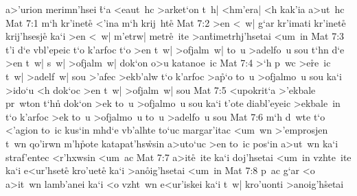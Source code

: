 a>'urion
merimn'hsei
\r{t}`a
<eaut~hc
>arket`on
t~h|
<hm'era|
<h
kak'ia
a>ut~hc\bibvsend
\vs Mat 7:1
m`h
kr'inet\r{e}
<'ina
m`h
krij~ht\r{e}\bibvsend
{}
\vs Mat 7:2
>en
<~w|
g`ar
kr'imati
kr'inet\r{e}
krij'hsesj\r{e}
ka`i
>en
<~w|
m'etrw|
metr\r{e}~ite
>an\r{t}imetrhj'hsetai
<um~in\bibvsend
\vs Mat 7:3
t'i
d`e
vbl'epeic
t`o
k'arfoc
t`o
>en
t~w|
>ofjalm~w|
to~u
>adelfo~u
sou
t`hn
d`e
>en
t~w|
s~w|
>ofjalm~w|
dok`on
o>u
katanoe~ic\bibvsend
\vs Mat 7:4
>`h
p~wc
>e\r{r}e~ic
t~w|
>adelf~w|
sou
>'afec
>ekb'alw
t`o
k'arfoc
>a\r{p}`o
to~u
>ofjalmo~u
sou
ka`i
>ido`u
<h
dok`oc
>en
t~w|
>ofjalm~w|
sou\bibvsend
\vs Mat 7:5
<upokrit`a
>'ekbale
pr~wton
t`hn\r{}
dok`on
>ek
to~u
>ofjalmo~u
sou
ka`i
t'ote
diabl'eyeic
>ekbale~in
t`o
k'arfoc
>ek
to~u
>ofjalmo~u
to~u
>adelfo~u
sou\bibvsend
\vs Mat 7:6
m`h
d~wte
t`o
<'agion
to~ic
kus`in
mhd`e
vb'alhte
to`uc
margar'itac
<um~wn
>'emprosjen
t~wn
qo'irwn
m'h\r{p}ote
katapat'hs\r{w}sin
a>uto`uc
>en
to~ic
pos`in
a>ut~wn
ka`i
straf'entec
<r'hxwsin
<um~ac\bibvsend
\vs Mat 7:7
a>it\r{e}~ite
ka`i
doj'hsetai
<um~in
vzhte~ite
ka`i
e<ur'hset\r{e}
kro'uet\r{e}
ka`i
>an\r{o}ig'hsetai
<um~in\bibvsend
\vs Mat 7:8
p~ac
g`ar
<o
a>it~wn
lamb'anei
ka`i
<o
vzht~wn
e<ur'iskei
ka`i
t~w|
kro'uonti
>anoig'h\r{s}etai\bibvsend
{}
